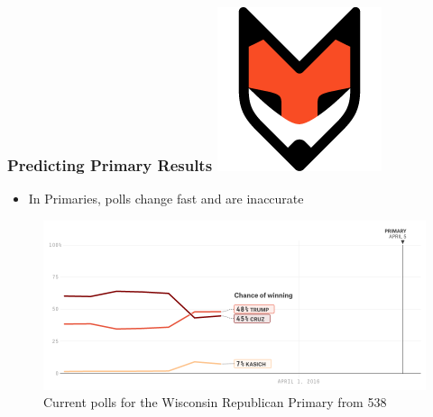 \documentclass[xcolor=dvipsnames]{beamer}
\begin{document}
\begin{frame}
\frametitle{Predicting Primary Results \hfill \includegraphics[scale=.15]{images/fivethirtyeight-logo}}

\begin{itemize}
\item In Primaries, polls change fast and are inaccurate	
\end{itemize}


\begin{figure}
\includegraphics[scale=.35]{poll2.png}
\caption{Current polls for the Wisconsin Republican Primary from 538}
\end{figure}

\end{frame}
\end{document}
